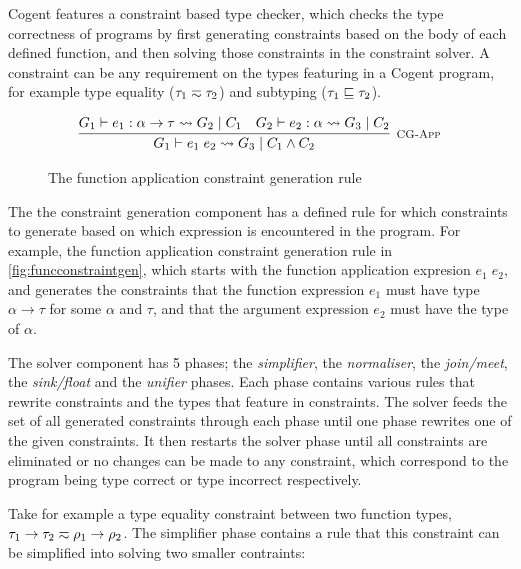 Cogent features a constraint based type checker, which checks the type
correctness of programs by first generating constraints based on the
body of each defined function, and then solving those constraints in
the constraint solver. A constraint can be any requirement on the types
featuring in a Cogent program, for example type equality ($\tau_1 \typeeq \tau_2$)
and subtyping ($\tau_1 \sqsubseteq \tau_2$).

\begin{figure}
    \centering
    \[
        \infer[\textsc{\footnotesize CG-App}]{
            G_1 \vdash e_1\; e_2 \rightsquigarrow G_3\; |\; C_1 \land C_2
        }{
            G_1 \vdash e_1 : \alpha \rightarrow \tau
                \rightsquigarrow G_2\; |\; C_1
            \hspace{1em}
            G_2 \vdash e_2 : \alpha \rightsquigarrow G_3\; |\; C_2
        }    
    \]
    
    \caption{The function application constraint generation rule}
    \label{fig:funcconstraintgen}
\end{figure}

The the constraint generation component has a defined rule for which constraints
to generate based on which expression is encountered in the program. For
example, the function application constraint generation rule in
\autoref{fig:funcconstraintgen}, which starts with the function application
expresion $e_1\; e_2$, and generates the constraints that the function
expression $e_1$ must have type $\alpha \rightarrow \tau$ for some
$\alpha$ and $\tau$, and that the argument expression $e_2$ must have
the type of $\alpha$.

The solver component has 5 phases; the \textit{simplifier}, the \textit{normaliser},
the \textit{join/meet}, the \textit{sink/float} and the \textit{unifier} 
phases. Each phase contains various rules that rewrite constraints
and the types that feature in constraints. The solver feeds the set of
all generated constraints through each phase until one phase rewrites
one of the given constraints. It then restarts the solver phase until
all constraints are eliminated or no changes can be made to any constraint,
which correspond to the program being type correct or type incorrect respectively.

Take for example a type equality constraint between two function types,
$\tau_1 \rightarrow \tau_2 \typeeq \rho_1 \rightarrow \rho_2$. The simplifier
phase contains a rule that this constraint can be simplified into solving
two smaller contraints: 

